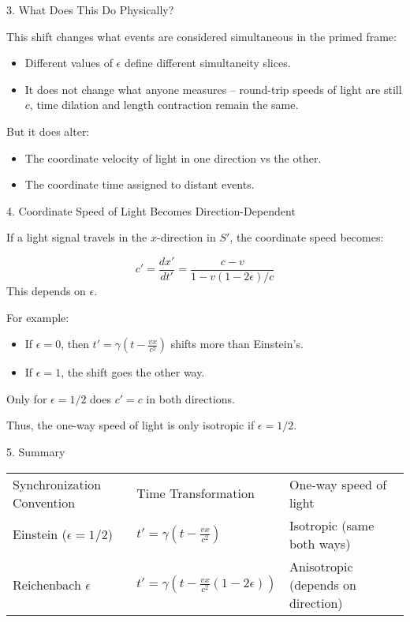 \documentclass[a4paper]{article}
\theoremstyle{plain}
\theoremstyle{definition}
\begin{document}
3. What Does This Do Physically?

This shift changes what events are considered simultaneous in the
primed frame:
\begin{itemize}
\item Different values of $\epsilon$ define different simultaneity
  slices.
\item It does not change what anyone measures -- round-trip speeds of
  light are still $c$, time dilation and length contraction remain the
  same.
\end{itemize}
But it does alter:
\begin{itemize}
\item The coordinate velocity of light in one direction vs the other.
\item The coordinate time assigned to distant events.
\end{itemize}

4. Coordinate Speed of Light Becomes Direction-Dependent

If a light signal travels in the $x$-direction in $S'$, the coordinate
speed becomes:

\begin{equation}
c' = \frac{dx'}{dt'} = \frac{c-v}{1 - v(1-2\epsilon)/c}
\end{equation}
This depends on $\epsilon$.

For example:
\begin{itemize}
\item If $\epsilon = 0$, then $t' = \gamma(t - \frac{vx}{c^2})$ shifts
  more than Einstein's.
\item If $\epsilon = 1$, the shift goes the other way.
\end{itemize}

Only for $\epsilon = 1/2$ does $c' = c$ in both directions.

Thus, the one-way speed of light is only isotropic if $\epsilon =
1/2$.

5. Summary

\begin{tabularx}{1.0\textwidth}{|p{3.4cm}|p{5cm}|p{5cm}|}
\cline{1-3} \\
Synchronization Convention & Time Transformation & One-way speed of light
\\ \cline{1-3}
Einstein ($\epsilon = 1/2$) & $t' = \gamma (t - \frac{vx}{c^2})$ & Isotropic (same both ways)
\\ \cline{1-3}
Reichenbach $\epsilon$ & $t' = \gamma (t - \frac{vx}{c^2} (1 - 2\epsilon))$ & Anisotropic (depends on direction)
\\ \cline{1-3}
\end{tabularx}
\end{document}
